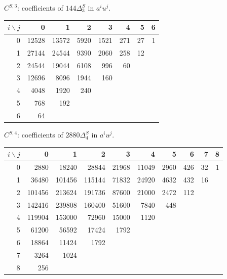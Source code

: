 \begin{center}
\begin{minipage}{\textwidth}
\centering\small
$C^{S,3}$: coefficients of $144\Delta^{S}_{3}$ in $a^i u^j$.\par\smallskip
\setlength{\tabcolsep}{5pt}
\renewcommand{\arraystretch}{1.12}
\begin{tabular}{r|rrrrrrr}
$i\backslash j$ & 0 & 1 & 2 & 3 & 4 & 5 & 6 \\
\hline
0 & 12528 & 13572 & 5920 & 1521 & 271 & 27 & 1 \\
1 & 27144 & 24544 & 9390 & 2060 & 258 & 12 &  \\
2 & 24544 & 19044 & 6108 & 996 & 60 &  &  \\
3 & 12696 & 8096 & 1944 & 160 &  &  &  \\
4 & 4048 & 1920 & 240 &  &  &  &  \\
5 & 768 & 192 &  &  &  &  &  \\
6 & 64 &  &  &  &  &  &  \\
\end{tabular}
\end{minipage}
\end{center}
\begin{center}
\begin{minipage}{\textwidth}
\centering\small
$C^{S,4}$: coefficients of $2880\Delta^{S}_{4}$ in $a^i u^j$.\par\smallskip
\setlength{\tabcolsep}{5pt}
\renewcommand{\arraystretch}{1.12}
\begin{tabular}{r|rrrrrrrrr}
$i\backslash j$ & 0 & 1 & 2 & 3 & 4 & 5 & 6 & 7 & 8 \\
\hline
0 & 2880 & 18240 & 28844 & 21968 & 11049 & 2960 & 426 & 32 & 1 \\
1 & 36480 & 101456 & 115144 & 71832 & 24920 & 4632 & 432 & 16 &  \\
2 & 101456 & 213624 & 191736 & 87600 & 21000 & 2472 & 112 &  &  \\
3 & 142416 & 239808 & 160400 & 51600 & 7840 & 448 &  &  &  \\
4 & 119904 & 153000 & 72960 & 15000 & 1120 &  &  &  &  \\
5 & 61200 & 56592 & 17424 & 1792 &  &  &  &  &  \\
6 & 18864 & 11424 & 1792 &  &  &  &  &  &  \\
7 & 3264 & 1024 &  &  &  &  &  &  &  \\
8 & 256 &  &  &  &  &  &  &  &  \\
\end{tabular}
\end{minipage}
\end{center}
